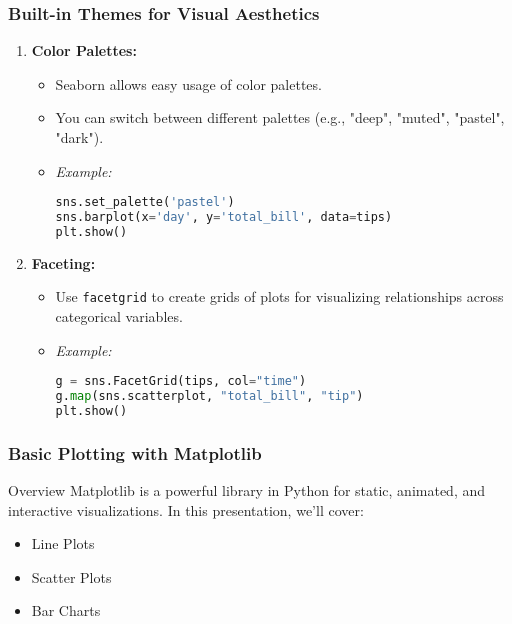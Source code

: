\documentclass{beamer}
\begin{document}
\begin{frame}[fragile]
    \frametitle{Built-in Themes for Visual Aesthetics}
    
    \begin{enumerate}
        \item \textbf{Color Palettes:} 
        \begin{itemize}
            \item Seaborn allows easy usage of color palettes.
            \item You can switch between different palettes (e.g., "deep", "muted", "pastel", "dark").
            \item \textit{Example:}
            \begin{lstlisting}[language=Python]
sns.set_palette('pastel')
sns.barplot(x='day', y='total_bill', data=tips)
plt.show()
            \end{lstlisting}
        \end{itemize}

        \item \textbf{Faceting:}
        \begin{itemize}
            \item Use \texttt{facetgrid} to create grids of plots for visualizing relationships across categorical variables.
            \item \textit{Example:}
            \begin{lstlisting}[language=Python]
g = sns.FacetGrid(tips, col="time")
g.map(sns.scatterplot, "total_bill", "tip")
plt.show()
            \end{lstlisting}
        \end{itemize}
    \end{enumerate}
\end{frame}

\begin{frame}
    \frametitle{Basic Plotting with Matplotlib}
    \begin{block}{Overview}
        Matplotlib is a powerful library in Python for static, animated, and interactive visualizations. In this presentation, we'll cover:
        \begin{itemize}
            \item Line Plots
            \item Scatter Plots
            \item Bar Charts
        \end{itemize}
    \end{block}
\end{frame}
\end{document}

